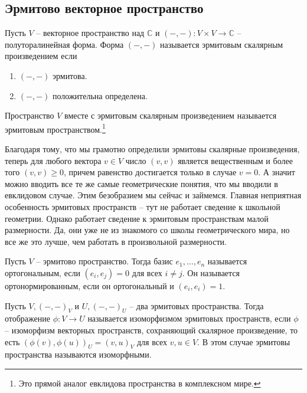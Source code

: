 \subsection{Эрмитово векторное пространство}

\begin{definition}
Пусть $V$ -- векторное пространство над $\mathbb C$ и $({-},{-})\colon V\times V\to \mathbb C$ -- полуторалинейная форма. Форма $({-},{-})$ называется эрмитовым скалярным произведением если
\begin{enumerate}
\item $({-},{-})$ эрмитова.
\item $({-},{-})$ положительна определена.
\end{enumerate}

Пространство $V$ вместе с эрмитовым скалярным произведением называется эрмитовым пространством.\footnote{Это прямой аналог евклидова пространства в комплексном мире.}
\end{definition}

Благодаря тому, что мы грамотно определили эрмитовы скалярные произведения, теперь для любого вектора $v\in V$ число $(v,v)$ является вещественным и более того $(v,v) \geqslant 0$, причем равенство достигается только в случае $v=0$. А значит можно вводить все те же самые геометрические понятия, что мы вводили в евклидовом случае. Этим безобразием мы сейчас и займемся. Главная неприятная особенность эрмитовых пространств -- тут не работает сведение к школьной геометрии. Однако работает сведение к эрмитовым пространствам малой размерности. Да, они уже не из знакомого со школы геометрического мира, но все же это лучше, чем работать в произвольной размерности.

\begin{definition}
Пусть $V$ -- эрмитово пространство. Тогда базис $e_1,\ldots,e_n$ называется ортогональным, если  $(e_i, e_j) = 0$ для всех $i\neq j$. Он называется ортонормированным, если он ортогональный и $(e_i, e_i) = 1$.
\end{definition}

\begin{definition}
Пусть $V, ({-},{-})_V$ и $U, ({-},{-})_U$ -- два эрмитовых пространства. Тогда отображение $\phi\colon V\to U$ называется изоморфизмом эрмитовых пространств, если $\phi$ -- изоморфизм векторных пространств, сохраняющий скалярное произведение, то есть $(\phi(v), \phi(u))_U = (v, u)_V$ для всех $v, u \in V$. В этом случае эрмитовы пространства называются изоморфными.
\end{definition}

